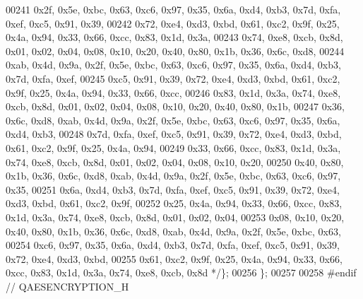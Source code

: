 \begin{DoxyCode}
00241 \textcolor{comment}{        0x2f, 0x5e, 0xbc, 0x63, 0xc6, 0x97, 0x35, 0x6a, 0xd4, 0xb3, 0x7d, 0xfa, 0xef, 0xc5, 0x91, 0x39,}
00242 \textcolor{comment}{        0x72, 0xe4, 0xd3, 0xbd, 0x61, 0xc2, 0x9f, 0x25, 0x4a, 0x94, 0x33, 0x66, 0xcc, 0x83, 0x1d, 0x3a,}
00243 \textcolor{comment}{        0x74, 0xe8, 0xcb, 0x8d, 0x01, 0x02, 0x04, 0x08, 0x10, 0x20, 0x40, 0x80, 0x1b, 0x36, 0x6c, 0xd8,}
00244 \textcolor{comment}{        0xab, 0x4d, 0x9a, 0x2f, 0x5e, 0xbc, 0x63, 0xc6, 0x97, 0x35, 0x6a, 0xd4, 0xb3, 0x7d, 0xfa, 0xef,}
00245 \textcolor{comment}{        0xc5, 0x91, 0x39, 0x72, 0xe4, 0xd3, 0xbd, 0x61, 0xc2, 0x9f, 0x25, 0x4a, 0x94, 0x33, 0x66, 0xcc,}
00246 \textcolor{comment}{        0x83, 0x1d, 0x3a, 0x74, 0xe8, 0xcb, 0x8d, 0x01, 0x02, 0x04, 0x08, 0x10, 0x20, 0x40, 0x80, 0x1b,}
00247 \textcolor{comment}{        0x36, 0x6c, 0xd8, 0xab, 0x4d, 0x9a, 0x2f, 0x5e, 0xbc, 0x63, 0xc6, 0x97, 0x35, 0x6a, 0xd4, 0xb3,}
00248 \textcolor{comment}{        0x7d, 0xfa, 0xef, 0xc5, 0x91, 0x39, 0x72, 0xe4, 0xd3, 0xbd, 0x61, 0xc2, 0x9f, 0x25, 0x4a, 0x94,}
00249 \textcolor{comment}{        0x33, 0x66, 0xcc, 0x83, 0x1d, 0x3a, 0x74, 0xe8, 0xcb, 0x8d, 0x01, 0x02, 0x04, 0x08, 0x10, 0x20,}
00250 \textcolor{comment}{        0x40, 0x80, 0x1b, 0x36, 0x6c, 0xd8, 0xab, 0x4d, 0x9a, 0x2f, 0x5e, 0xbc, 0x63, 0xc6, 0x97, 0x35,}
00251 \textcolor{comment}{        0x6a, 0xd4, 0xb3, 0x7d, 0xfa, 0xef, 0xc5, 0x91, 0x39, 0x72, 0xe4, 0xd3, 0xbd, 0x61, 0xc2, 0x9f,}
00252 \textcolor{comment}{        0x25, 0x4a, 0x94, 0x33, 0x66, 0xcc, 0x83, 0x1d, 0x3a, 0x74, 0xe8, 0xcb, 0x8d, 0x01, 0x02, 0x04,}
00253 \textcolor{comment}{        0x08, 0x10, 0x20, 0x40, 0x80, 0x1b, 0x36, 0x6c, 0xd8, 0xab, 0x4d, 0x9a, 0x2f, 0x5e, 0xbc, 0x63,}
00254 \textcolor{comment}{        0xc6, 0x97, 0x35, 0x6a, 0xd4, 0xb3, 0x7d, 0xfa, 0xef, 0xc5, 0x91, 0x39, 0x72, 0xe4, 0xd3, 0xbd,}
00255 \textcolor{comment}{            0x61, 0xc2, 0x9f, 0x25, 0x4a, 0x94, 0x33, 0x66, 0xcc, 0x83, 0x1d, 0x3a, 0x74, 0xe8, 0xcb, 0x8d 
      */}\};
00256 \};
00257 
00258 \textcolor{preprocessor}{#endif // QAESENCRYPTION\_H}
\end{DoxyCode}
